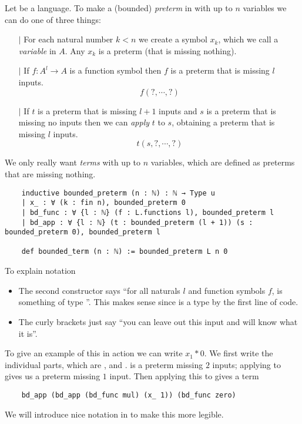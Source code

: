 \begin{dfn}[Terms]
  Let  be a language.
  To make a (bounded) \textit{preterm} in  with up to $n$ variables
  we can do one of three things:
  \begin{itemize}
    \item[$\vert$] For each natural number $k < n$ we create a symbol
          $x_{k}$, which we call a \textit{variable} in $A$.
          Any $x_{k}$ is a preterm (that is missing nothing).
    \item[$\vert$] If $f : A^{l} \to A$ is a function symbol then
          $f$ is a preterm that is missing $l$ inputs.
          \[ f( ? , \cdots , ? )\]
    \item[$\vert$] If $t$ is a preterm that is missing
          $l + 1$ inputs and $s$ is a preterm that is missing
          no inputs then we can \textit{apply} $t$ to $s$, obtaining
          a preterm that is missing $l$ inputs.
          \[ t(s , ? , \cdots, ? )\]
  \end{itemize}

  We only really want \textit{terms} with up to $n$ variables,
  which are defined as preterms that are missing nothing.

  \begin{lstlisting}
    inductive bounded_preterm (n : ℕ) : ℕ → Type u
    | x_ : ∀ (k : fin n), bounded_preterm 0
    | bd_func : ∀ {l : ℕ} (f : L.functions l), bounded_preterm l
    | bd_app : ∀ {l : ℕ} (t : bounded_preterm (l + 1)) (s : bounded_preterm 0), bounded_preterm l

    def bounded_term (n : ℕ) := bounded_preterm L n 0\end{lstlisting}

  To explain notation
  \begin{itemize}
    \item The second constructor says ``for all naturals $l$ and function symbols $f$,
           is something of type ''.
          This makes sense since  is a type by the first line of code.
    \item The curly brackets just say
          ``you can leave out this input and  will know what it is''.
  \end{itemize}

  To give an example of this in action we can write $x_{1} * 0$.
  We first write the individual parts, which are
  ,  and
  .
   is a preterm missing $2$ inputs;
  applying  to  gives us a preterm 
  missing $1$ input.
  Then applying this to  gives a term
  \begin{lstlisting}
    bd_app (bd_app (bd_func mul) (x_ 1)) (bd_func zero) \end{lstlisting}
  We will introduce nice notation in  to make this more legible.
\end{dfn}

